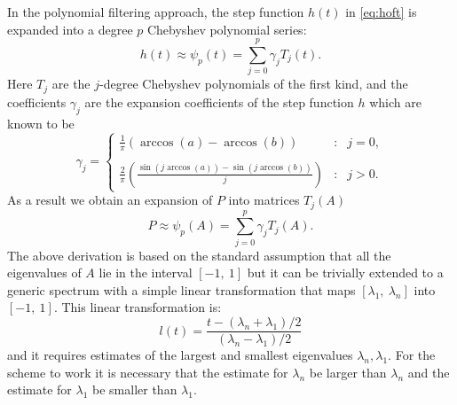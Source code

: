 \documentclass[12pt]{article}		\usepackage{tabls,multirow}
\newcommand{\eq}[1]{\begin{equation}\label{#1}}
\newcommand{\en}{\end{equation}}
\begin{document}
In the polynomial filtering approach, the step function $h(t)$ in
\eqref{eq:hoft} is expanded into a degree $p$ Chebyshev polynomial
series: 
\eq{eq:polH} h(t) \approx \psi_p(t) = \sum_{j=0}^p \gamma_j
T_j(t) .  
\en 
Here $T_j$ are the $j$-degree Chebyshev polynomials of
the first kind, and the coefficients $\gamma_j$ are the expansion
coefficients of the step function $h$ which are known to be
\eq{eq:gammaj}
\gamma_{j}=
\left\{ \begin{array}{rcl}
{\displaystyle \frac{1}{\pi}\left( \arccos(a)-\arccos(b)\right) } & : & j = 0, \\
\ \\
{\displaystyle 
\frac{2}{\pi}\left( \frac{\sin(j\arccos(a)) - \sin(j\arccos(b))}
{j}\right)} & : & j > 0 . 
\end{array} \right.
 \en
As a result we obtain an expansion of $P$ into matrices $T_j(A)$
\eq{eq:polP}
P \approx \psi_p(A) = \sum_{j=0}^p \gamma_j T_j(A). 
\en
The above derivation is based on the standard assumption that all the
eigenvalues of $A$ lie in the interval $[-1, \ 1]$ but it can be
trivially extended to a generic spectrum with a simple linear
transformation that maps $[\lambda_1, \ \lambda_n ]$ into $[-1, \ 1]$.
This linear transformation is: 
\[
l(t) = \frac{t - (\lambda_n + \lambda_1)/2}{ (\lambda_n - \lambda_1)/2} 
\]
and it 
requires estimates of the largest and smallest eigenvalues $\lambda_n, 
\lambda_1$. For the scheme to work it is necessary that
the estimate for $\lambda_n $  be larger than 
$\lambda_n $ and 
the estimate for $\lambda_1 $  be smaller than 
$\lambda_1 $.
\end{document}

